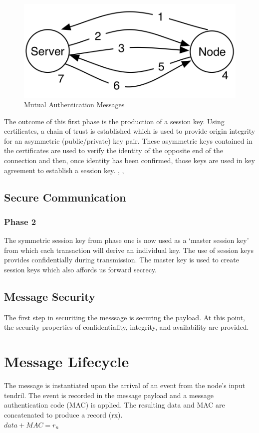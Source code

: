 \begin{figure}
    \centering
    \includegraphics[scale=1, angle=0]{Figures/mutualAuthenticationMessages}
    \caption[Mutual Authentication Messages]{Mutual Authentication Messages}
    \label{fig:mutualAuthenticationMessages}
\end{figure}

The outcome of this first phase is the production of a session key. Using certificates, a chain of trust is established which is used to provide origin integrity for an asymmetric (public/private) key pair. 
These asymmetric keys contained in the certificates are used to verify the identity of the opposite end of the connection and then, once identity has been confirmed, those keys are used in key agreement to establish a session key. 
\cite{Rescorla:2000tv}, \cite{Viega:2002wt}, \cite{Oppliger:2014wm}

\subsection{Secure Communication}
\subsubsection{Phase 2}
The symmetric session key from phase one is now used as a ‘master session key’ from which each transaction will derive an individual key. The use of session keys provides confidentially during transmission. The master key is used to create session keys which also affords us forward secrecy.  

\subsection{Message Security}
The first step in securiting the messsage is securing the payload. 
At this point, the security properties of confidentiality, integrity, and availability are provided.

\section{Message Lifecycle}
The message is instantiated upon the arrival of an event from the node’s input tendril.  The event is recorded in the message payload and a message authentication code (MAC) is applied. The resulting data and MAC are concatenated to produce a record (rx).  \\
$data + MAC = r{_n}$
 
